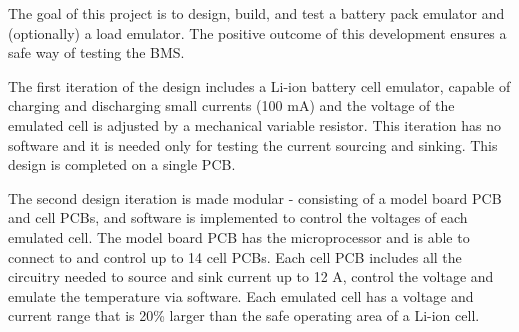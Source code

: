 \IEEEPARstart
{T}{he} goal of this project is to design, build, and test a battery pack emulator and (optionally)
a load emulator. The positive outcome of this development ensures a safe way of testing the BMS.


The first iteration of the design includes a Li-ion battery cell emulator, capable of charging and discharging small currents (100 mA) and
the voltage of the emulated cell is adjusted by a mechanical variable resistor. This iteration has no software and it is needed only for 
testing the current sourcing and sinking. This design is completed on a single PCB.

The second design iteration is made modular - consisting of a model board PCB and cell PCBs, and software is implemented to control the 
voltages of each emulated cell. The model board PCB has the microprocessor and is able to connect to and control up to 14 cell PCBs. Each
cell PCB includes all the circuitry needed to source and sink current up to 12 A, control the voltage and emulate the temperature via software.
Each emulated cell has a voltage and current range that is 20\% larger than the safe operating area of a Li-ion cell.





 



